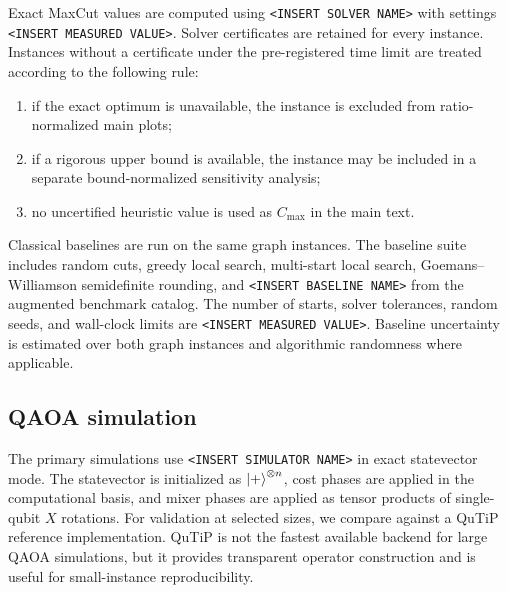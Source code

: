 \documentclass[reprint,aps,longbibliography]{revtex4-2}
\begin{document}
Exact MaxCut values are computed using \texttt{<INSERT SOLVER NAME>} with settings \texttt{<INSERT MEASURED VALUE>}. Solver certificates are retained for every instance. Instances without a certificate under the pre-registered time limit are treated according to the following rule:
\begin{enumerate}[label=(\roman*)]
\item if the exact optimum is unavailable, the instance is excluded from ratio-normalized main plots;
\item if a rigorous upper bound is available, the instance may be included in a separate bound-normalized sensitivity analysis;
\item no uncertified heuristic value is used as $C_{\max}$ in the main text.
\end{enumerate}

Classical baselines are run on the same graph instances. The baseline suite includes random cuts, greedy local search, multi-start local search, Goemans--Williamson semidefinite rounding, and \texttt{<INSERT BASELINE NAME>} from the augmented benchmark catalog. The number of starts, solver tolerances, random seeds, and wall-clock limits are \texttt{<INSERT MEASURED VALUE>}. Baseline uncertainty is estimated over both graph instances and algorithmic randomness where applicable.

\subsection{QAOA simulation}

The primary simulations use \texttt{<INSERT SIMULATOR NAME>} in exact statevector mode. The statevector is initialized as $\ket{+}^{\otimes n}$, cost phases are applied in the computational basis, and mixer phases are applied as tensor products of single-qubit $X$ rotations. For validation at selected sizes, we compare against a QuTiP reference implementation. QuTiP is not the fastest available backend for large QAOA simulations, but it provides transparent operator construction and is useful for small-instance reproducibility.
\end{document}
